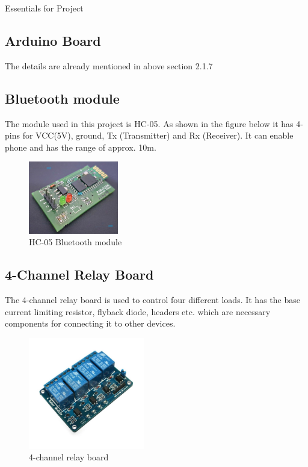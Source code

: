 \documentclass[12pt, oneside]{report}
\numberwithin{equation}{section}
\begin{document}
\begin{chapter}{Essentials for Project}
\subsection{Arduino Board}
The details are already mentioned in above section 2.1.7

\subsection{Bluetooth module}
The module used in this project is HC-05. As shown in the figure below it has 4-pins for VCC(5V), ground, Tx (Transmitter) and Rx (Receiver). It can enable phone and has the range of approx. 10m. \\
\begin{figure}[h]
\center
\includegraphics[width=0.35\textwidth]{Bluetooth}
\caption{HC-05 Bluetooth module}
\end{figure}

\subsection{4-Channel Relay Board}
The 4-channel relay board is used to control four different loads. It has the base current limiting resistor, flyback diode, headers etc. which are necessary components for connecting it to other devices.\\
\begin{figure}[h]
\center
\includegraphics[width=0.45\textwidth]{relay}
\caption{4-channel relay board}
\end{figure}


\end{chapter}
\end{document}
